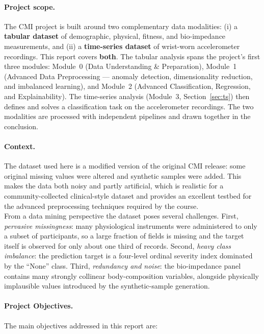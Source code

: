 \paragraph{Project scope.} The CMI project is built around two complementary data modalities: (i) a \textbf{tabular dataset} of demographic, physical, fitness, and bio-impedance measurements, and (ii) a \textbf{time-series dataset} of wrist-worn accelerometer recordings. This report covers \textbf{both}. The tabular analysis spans the project's first three modules: Module~0 (Data Understanding \& Preparation), Module~1 (Advanced Data Preprocessing --- anomaly detection, dimensionality reduction, and imbalanced learning), and Module~2 (Advanced Classification, Regression, and Explainability). The time-series analysis (Module~3, Section~\ref{sec:ts}) then defines and solves a classification task on the accelerometer recordings. The two modalities are processed with independent pipelines and drawn together in the conclusion.\\

\paragraph{Context.} The dataset used here is a modified version of the original CMI release: some original missing values were altered and synthetic samples were added. This makes the data both noisy and partly artificial, which is realistic for a community-collected clinical-style dataset and provides an excellent testbed for the advanced preprocessing techniques required by the course.\\

From a data mining perspective the dataset poses several challenges. First, \emph{pervasive missingness}: many physiological instruments were administered to only a subset of participants, so a large fraction of fields is missing and the target itself is observed for only about one third of records. Second, \emph{heavy class imbalance}: the prediction target is a four-level ordinal severity index dominated by the ``None'' class. Third, \emph{redundancy and noise}: the bio-impedance panel contains many strongly collinear body-composition variables, alongside physically implausible values introduced by the synthetic-sample generation.\\

\paragraph{Project Objectives.} The main objectives addressed in this report are:

